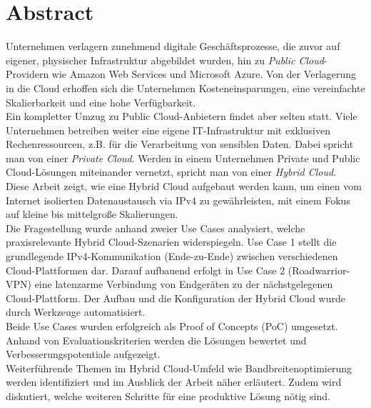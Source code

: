 \chapter{Abstract}

Unternehmen verlagern zunehmend digitale Geschäftsprozesse, die zuvor auf eigener, physischer Infrastruktur abgebildet wurden, hin zu \textit{Public Cloud}-Providern wie Amazon Web Services und Microsoft Azure. Von der Verlagerung in die Cloud erhoffen sich die Unternehmen Kosteneinsparungen, eine vereinfachte Skalierbarkeit und eine hohe Verfügbarkeit.\\
Ein kompletter Umzug zu Public Cloud-Anbietern findet aber selten statt. Viele Unternehmen betreiben weiter eine eigene IT-Infrastruktur mit exklusiven Rechenressourcen, z.B. für die Verarbeitung von sensiblen Daten. Dabei spricht man von einer \textit{Private Cloud}. Werden in einem Unternehmen Private und Public Cloud-Lösungen miteinander vernetzt, spricht man von einer \textit{Hybrid Cloud}. \\
Diese Arbeit zeigt, wie eine Hybrid Cloud aufgebaut werden kann, um einen vom Internet isolierten Datenaustausch via IPv4 zu gewährleisten, mit einem Fokus auf kleine bis mittelgroße Skalierungen.\\
Die Fragestellung wurde anhand zweier Use Cases analysiert, welche praxisrelevante Hybrid Cloud-Szenarien widerspiegeln. Use Case 1 stellt die grundlegende IPv4-Kommunikation (\glqq Ende-zu-Ende\grqq{}) zwischen verschiedenen Cloud-Plattformen dar. Darauf aufbauend erfolgt in Use Case 2 (\glqq Roadwarrior-VPN\grqq{}) eine latenzarme Verbindung von Endgeräten zu der nächstgelegenen Cloud-Plattform. Der Aufbau und die Konfiguration der Hybrid Cloud wurde durch Werkzeuge automatisiert.\\
Beide Use Cases wurden erfolgreich als Proof of Concepts (PoC) umgesetzt. Anhand von Evaluationskriterien werden die Lösungen bewertet und Verbesserungspotentiale aufgezeigt.\\
Weiterführende Themen im Hybrid Cloud-Umfeld wie Bandbreitenoptimierung werden identifiziert und im Ausblick der Arbeit näher erläutert. Zudem wird diskutiert, welche weiteren Schritte für eine produktive Lösung nötig sind.\\